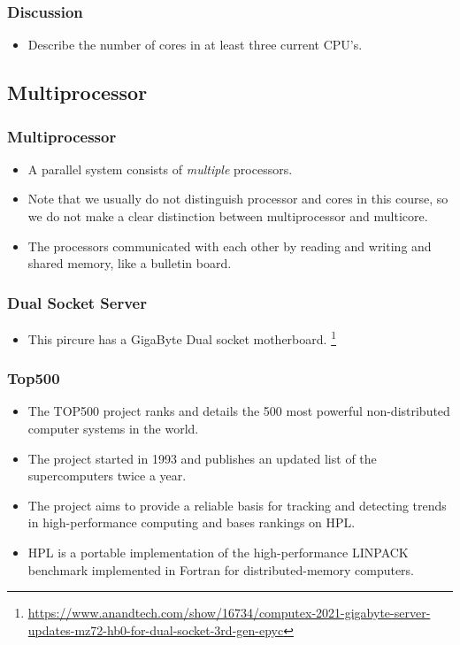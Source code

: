 \documentclass{beamer}
\begin{document}
\begin{CJK}{UTF8}{bsmi}
  \begin{frame}
    \frametitle{Discussion} 
    \begin{itemize}
    \item Describe the number of cores in at least three current CPU's.
    \end{itemize}
  \end{frame}


  \subsection{Multiprocessor}

  \begin{frame}
    \frametitle{Multiprocessor} 
    \begin{itemize}
    \item A parallel system consists of {\em multiple} processors.
    \item Note that we usually do not distinguish processor and cores in this course, so we do not make a clear distinction between multiprocessor and multicore.
    \item The processors communicated with each other by reading and writing and shared memory, like a bulletin board.
    \end{itemize}
  \end{frame}

  \begin{frame}
    \frametitle{Dual Socket Server}
    \begin{itemize}
    \item This pircure has a GigaByte Dual socket motherboard.
      \footnote{\url{https://www.anandtech.com/show/16734/computex-2021-gigabyte-server-updates-mz72-hb0-for-dual-socket-3rd-gen-epyc}}
    \end{itemize}
    \centerline{}
  \end{frame}




  \begin{frame}
    \frametitle{Top500}
    \begin{itemize}
    \item The TOP500 project ranks and details the 500 most powerful
      non-distributed computer systems in the world.
    \item The project started in 1993 and publishes an updated list of
      the supercomputers twice a year.
    \item The project aims to provide a reliable basis for tracking and detecting trends in high-performance computing and bases rankings on
      HPL. 
\item HPL is a portable implementation of the high-performance LINPACK benchmark implemented in Fortran for distributed-memory computers.
    \end{itemize}
  \end{frame}


\end{CJK}
\end{document}
